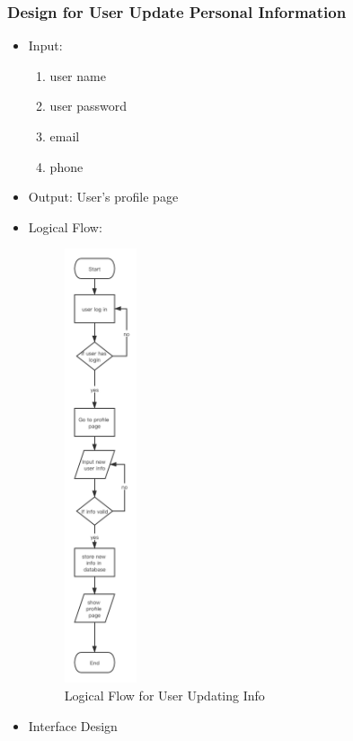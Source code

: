 \documentclass[16pt]{scrreprt}
\begin{document}
\subsubsection{Design for User Update Personal Information}
\begin{itemize}
	\item Input: 
	\begin{enumerate}
		\item user name
		\item user password
		\item email
		\item phone
	\end{enumerate}
	\item Output: User's profile page
	\item Logical Flow:
	 \begin{figure}[H]
	\centering
	\includegraphics[width=0.2\textwidth]{diagrams/updateinfo.png}
	\caption{Logical Flow for User Updating Info}
\end{figure}
	\item Interface Design
	\begin{center}

\end{center}
\end{itemize}
\end{document}
